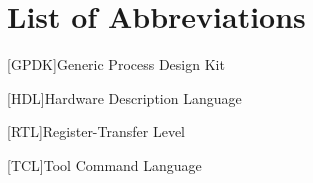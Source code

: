 \section*{List of Abbreviations}
\begin{acronym}
		
	[GPDK]{Generic Process Design Kit}
		
	[HDL]{Hardware Description Language}
		
	[RTL]{Register-Transfer Level}
	
	[TCL]{Tool Command Language}
\end{acronym}


